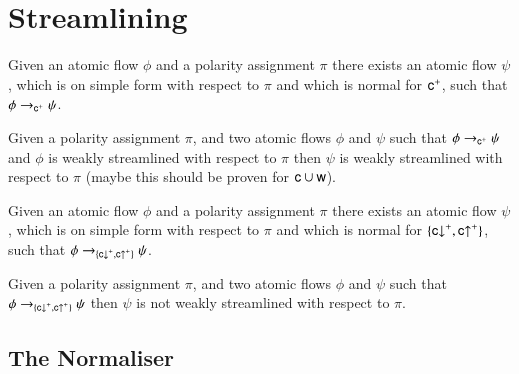\chapter{Streamlining}



\begin{lemma}
Given an atomic flow $\phi$ and a polarity assignment $\pi$ there exists an atomic flow $\psi$, which is on simple form with respect to $\pi$ and which is normal for $\frc^\ppl$, such that $\phi\to_{\frc^\ppl}\psi$.
\end{lemma}

\begin{lemma}
Given a polarity assignment $\pi$, and two atomic flows $\phi$ and $\psi$ such that $\phi\to_{\frc^\ppl}\psi$ and $\phi$ is weakly streamlined with respect to $\pi$ then $\psi$ is weakly streamlined with respect to $\pi$ (maybe this should be proven for ${\mathsf c}\cup{\mathsf w}$).
\end{lemma}

\begin{lemma}
Given an atomic flow $\phi$ and a polarity assignment $\pi$ there exists an atomic flow $\psi$, which is on simple form with respect to $\pi$ and which is normal for $\{\rcd^\ppl,\rcu^\ppl\}$, such that $\phi\to_{\{\rcd^\ppl,\rcu^\ppl\}}\psi$.
\end{lemma}

\begin{remark}
Given a polarity assignment $\pi$, and two atomic flows $\phi$ and $\psi$ such that $\phi\to_{\{\rcd^\ppl,\rcu^\ppl\}}\psi$ then $\psi$ is not weakly streamlined with respect to $\pi$.
\end{remark}


\section{The Normaliser}\label{SectNorm}


